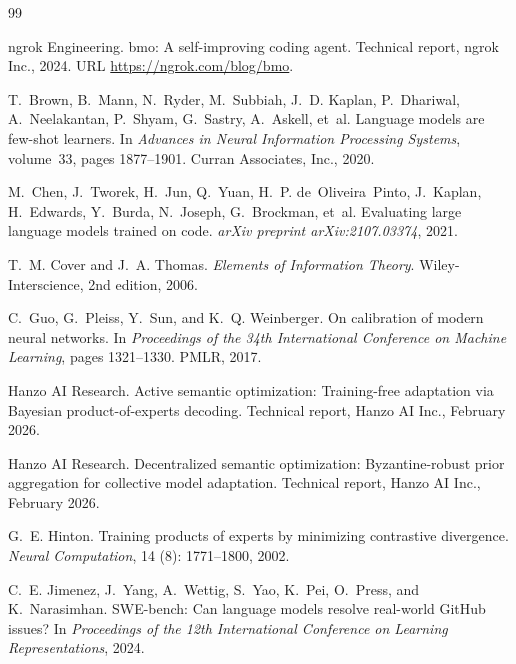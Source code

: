 
\begin{thebibliography}{99}

ngrok Engineering.
\newblock bmo: A self-improving coding agent.
\newblock Technical report, ngrok Inc., 2024.
\newblock URL \url{https://ngrok.com/blog/bmo}.

T.~Brown, B.~Mann, N.~Ryder, M.~Subbiah, J.~D. Kaplan, P.~Dhariwal,
  A.~Neelakantan, P.~Shyam, G.~Sastry, A.~Askell, et~al.
\newblock Language models are few-shot learners.
\newblock In \emph{Advances in Neural Information Processing Systems},
  volume~33, pages 1877--1901. Curran Associates, Inc., 2020.

M.~Chen, J.~Tworek, H.~Jun, Q.~Yuan, H.~P. de~Oliveira~Pinto, J.~Kaplan,
  H.~Edwards, Y.~Burda, N.~Joseph, G.~Brockman, et~al.
\newblock Evaluating large language models trained on code.
\newblock \emph{arXiv preprint arXiv:2107.03374}, 2021.

T.~M. Cover and J.~A. Thomas.
\newblock \emph{Elements of Information Theory}.
\newblock Wiley-Interscience, 2nd edition, 2006.

C.~Guo, G.~Pleiss, Y.~Sun, and K.~Q. Weinberger.
\newblock On calibration of modern neural networks.
\newblock In \emph{Proceedings of the 34th International Conference on Machine
  Learning}, pages 1321--1330. PMLR, 2017.

Hanzo AI Research.
\newblock Active semantic optimization: Training-free adaptation via Bayesian
  product-of-experts decoding.
\newblock Technical report, Hanzo AI Inc., February 2026.

Hanzo AI Research.
\newblock Decentralized semantic optimization: Byzantine-robust prior
  aggregation for collective model adaptation.
\newblock Technical report, Hanzo AI Inc., February 2026.

G.~E. Hinton.
\newblock Training products of experts by minimizing contrastive divergence.
\newblock \emph{Neural Computation}, 14 (8): 1771--1800,
  2002.

C.~E. Jimenez, J.~Yang, A.~Wettig, S.~Yao, K.~Pei, O.~Press, and K.~Narasimhan.
\newblock SWE-bench: Can language models resolve real-world GitHub issues?
\newblock In \emph{Proceedings of the 12th International Conference on Learning
  Representations}, 2024.


\end{thebibliography}
